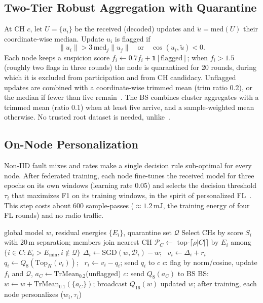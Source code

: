 \documentclass[journal,onecolumn,draftclsnofoot,12pt]{IEEEtran}
\begin{document}
\subsection{Two-Tier Robust Aggregation with Quarantine}
At CH $c$, let $U=\{u_i\}$ be the received (decoded) updates and $\tilde u=\mathrm{med}(U)$ their coordinate-wise median. Update $u_i$ is flagged if
\begin{equation}
\|u_i\|>3\,\mathrm{med}_j\|u_j\|\quad\text{or}\quad\cos(u_i,\tilde u)<0 .
\end{equation}
Each node keeps a suspicion score $f_i\leftarrow0.7f_i+\mathbf{1}[\text{flagged}]$; when $f_i>1.5$ (roughly two flags in three rounds) the node is quarantined for 20 rounds, during which it is excluded from participation and from CH candidacy. Unflagged updates are combined with a coordinate-wise trimmed mean (trim ratio 0.2), or the median if fewer than five remain~\cite{yin2018}. The BS combines cluster aggregates with a trimmed mean (ratio 0.1) when at least five arrive, and a sample-weighted mean otherwise. No trusted root dataset is needed, unlike~\cite{cao2021}.

\subsection{On-Node Personalization}
Non-IID fault mixes and rates make a single decision rule sub-optimal for every node. After federated training, each node fine-tunes the received model for three epochs on its own windows (learning rate 0.05) and selects the decision threshold $\tau_i$ that maximizes F1 on its training windows, in the spirit of personalized FL~\cite{arivazhagan2019,tan2023}. This step costs about 600 sample-passes ($\approx1.2$\,mJ, the training energy of four FL rounds) and no radio traffic.

\begin{algorithm}[t]
\caption{One EASFL round}\label{alg:easfl}
\begin{algorithmic}[1]
\Require global model $w$, residual energies $\{E_i\}$, quarantine set $\mathcal{Q}$
\State Select CHs by score $S_i$ with 20\,m separation; members join nearest CH
 \State $\mathcal{P}_C\gets$ top-$\lceil\rho|C|\rceil$ by $E_i$ among $\{i\in C: E_i>E_{\min}, i\notin\mathcal{Q}\}$
  
   \State $\Delta_i\gets\mathrm{SGD}(w,\mathcal{D}_i)-w$; \ $v_i\gets\Delta_i+r_i$
   \State $q_i\gets Q_8(\mathrm{Top}_K(v_i))$; \ $r_i\gets v_i-q_i$; send $q_i$ to $c$
 \EndFor
 \State $c$: flag by norm/cosine, update $f_i$ and $\mathcal{Q}$, $a_C\gets\mathrm{TrMean}_{0.2}$(unflagged)
 \State $c$: send $Q_8(a_C)$ to BS
\EndFor
\State BS: $w\gets w+\mathrm{TrMean}_{0.1}(\{a_C\})$; broadcast $Q_{16}(w)$
\Ensure updated $w$; after training, each node personalizes ($w_i,\tau_i$)
\end{algorithmic}
\end{algorithm}
\end{document}
